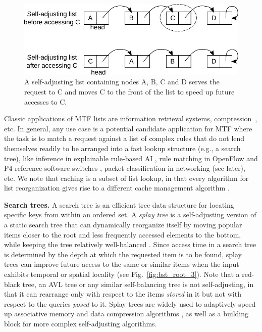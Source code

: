 \begin{figure}
  \centering
  \includegraphics[width=.75\linewidth]{fig/mtf.pdf}
  \caption{A self-adjusting list containing nodes A, B, C and D serves the request to C and moves C to the front of the list to speed up future accesses to C.}
  \label{fig:mtf-example}
\end{figure}

Classic applications of MTF lists are information retrieval systems, compression~\cite{BentleySTW86}, etc. In general, any use case is a potential candidate application for MTF where the task is to match a request against a list of complex rules that do not lend themselves readily to be arranged into a fast lookup structure (e.g., a search tree), like inference in explainable rule-based AI %
\cite{dovsilovic2018explainable}, rule matching in OpenFlow and P4 reference software switches \cite{openflow}, packet classification in networking (see later), etc.  We note that caching is a subset of list lookup, in that every algorithm for list reorganization gives rise to a different cache management algorithm \cite{SleatorT85}.  

\noindent%
\textbf{Search trees.} %
A search tree is an efficient tree data structure for locating specific keys from within an ordered set. A \emph{splay tree} is a self-adjusting version of a static search tree that can dynamically reorganize itself by moving popular items closer to the root and less frequently accessed elements to the bottom, while keeping the tree relatively well-balanced \cite{SleatorT85Splay, BoseDL08, Avin0020}. Since access time in a search tree is determined by the depth at which the requested item is to be found, splay trees can improve future access to the same or similar items when the input exhibits temporal or spatial locality (see Fig.~\ref{fig:bst_root_3}).  Note that a red-black tree, an AVL tree or any similar self-balancing tree is not self-adjusting, in that it can rearrange only with respect to the items \emph{stored} in it but not with respect to the queries \emph{posed} to it. Splay trees are widely used to adaptively speed up associative memory and data compression algorithms \cite{jones1988application}, as well as a building block for more complex self-adjusting algorithms.


